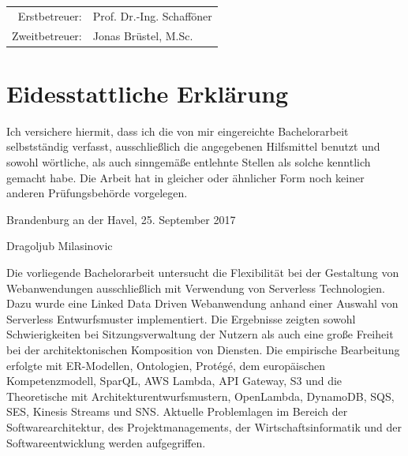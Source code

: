 \documentclass[
12pt,
english,
ngerman,
headsepline,
twoside,
openright,
numbers=noenddot,version=first
]{scrreprt}
\makeatletter
\providecommand{\tabularnewline}{\\}
\renewenvironment{abstract}{
\@beginparpenalty\@lowpenalty
\begin{center}
\normalfont\sectfont\nobreak\abstractname
\end{center}
\@endparpenalty\@M
}{
\par
}
\let\myTOC\tableofcontents
\renewcommand\tableofcontents{
\begin{spacing}{1.1}
\myTOC
\end{spacing}
\clearpage
\pagenumbering{arabic}
}
\makeatother
\begin{document}
\vspace{1cm}

\noindent \begin{center}
\medskip{}
\begin{tabular}{rl}
Erstbetreuer: & Prof. Dr.-Ing. Schafföner\tabularnewline
Zweitbetreuer: & Jonas Brüstel, M.Sc.\tabularnewline
\end{tabular}
\par\end{center}

\noindent \begin{center}
{\huge }
\par\end{center}{\huge \par}

\newpage{}

%
\tableofcontents{}

\pagestyle{scrheadings}

\chapter*{Eidesstattliche Erklärung}

Ich versichere hiermit, dass ich die von mir eingereichte Bachelorarbeit selbstständig verfasst, ausschließlich die angegebenen Hilfsmittel benutzt und sowohl wörtliche, als auch sinngemäße entlehnte Stellen als solche kenntlich gemacht habe. Die Arbeit hat in gleicher oder ähnlicher Form noch keiner anderen Prüfungsbehörde vorgelegen.

Brandenburg an der Havel, 25. September 2017

\vspace{3cm}

Dragoljub Milasinovic
\clearpage
\begin{abstract}

Die vorliegende Bachelorarbeit untersucht die Flexibilität bei der Gestaltung von Webanwendungen ausschließlich mit Verwendung von Serverless Technologien. Dazu wurde eine Linked Data Driven Webanwendung anhand einer Auswahl von Serverless Entwurfsmuster implementiert. Die Ergebnisse zeigten sowohl Schwierigkeiten bei Sitzungsverwaltung der Nutzern als auch eine große Freiheit bei der architektonischen Komposition von Diensten. Die empirische Bearbeitung erfolgte mit ER-Modellen, Ontologien, Protégé, dem europäischen Kompetenzmodell, SparQL, AWS Lambda, API Gateway, S3 und die Theoretische mit Architekturentwurfsmustern, OpenLambda, DynamoDB, SQS, SES, Kinesis Streams und SNS. Aktuelle Problemlagen im Bereich der Softwarearchitektur, des Projektmanagements, der Wirtschaftsinformatik und der Softwareentwicklung werden aufgegriffen. 

\end{abstract}
\end{document}
